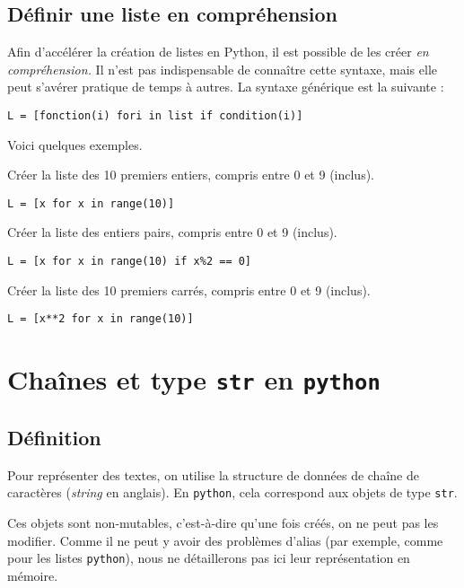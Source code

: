 \subsection{Définir une liste en compréhension}

Afin d'accélérer la création de listes en Python, il est possible de les créer \textit{en compréhension.} Il n'est pas indispensable de connaître cette syntaxe, mais elle peut s'avérer pratique de temps à autres.
La syntaxe générique est la suivante :

\begin{lstlisting}
L = [fonction(i) fori in list if condition(i)]
\end{lstlisting}


Voici quelques exemples. 

Créer la liste des 10 premiers entiers, compris entre 0 et 9 (inclus).
\begin{lstlisting}
L = [x for x in range(10)]
\end{lstlisting}

Créer la liste des entiers pairs, compris entre 0 et 9 (inclus).
\begin{lstlisting}
L = [x for x in range(10) if x%2 == 0]
\end{lstlisting}


Créer la liste des 10 premiers carrés, compris entre 0 et 9 (inclus).
\begin{lstlisting}
L = [x**2 for x in range(10)]
\end{lstlisting}


\section{Chaînes et type \texttt{str} en \texttt{python}}

\subsection{Définition}

Pour représenter des textes, on utilise la structure de données de \og chaîne de caractères \fg{} (\emph{string} en anglais). En \texttt{python}, cela correspond aux objets de type \texttt{str}.

Ces objets sont non-mutables, c'est-à-dire qu'une fois créés, on ne peut pas les modifier. 
Comme il ne peut y avoir des problèmes d'alias (par exemple, comme pour les listes \texttt{python}), nous ne détaillerons pas ici leur représentation en mémoire. 

